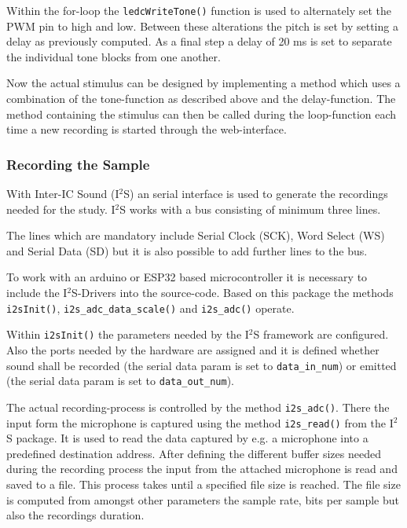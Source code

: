 Within the for-loop the \texttt{ledcWriteTone()} function is used to alternately set the PWM pin to high and low.
Between these alterations the pitch is set by setting a delay as previously computed.
As a final step a delay of 20 ms is set to separate the individual tone blocks from one another.

Now the actual stimulus can be designed by implementing a method which uses a combination of the tone-function as described above and the delay-function.
The method containing the stimulus can then be called during the loop-function each time a new recording is started through the web-interface.

\subsubsection{Recording the Sample}
With Inter-IC Sound (I$^2$S) an serial interface is used to generate the recordings needed for the study.
I$^2$S works with a bus consisting of minimum three lines.

The lines which are mandatory include Serial Clock (SCK), Word Select (WS) and Serial Data (SD) but it is also possible to add further lines to the bus.  

To work with an arduino or ESP32 based microcontroller it is necessary to include the I$^2$S-Drivers into the source-code.
Based on this package the methods\texttt{ i2sInit()}, \texttt{i2s\_adc\_data\_scale()} and \texttt{i2s\_adc()} operate.

Within \texttt{i2sInit()} the parameters needed by the I$^2$S framework are configured.
Also the ports needed by the hardware are assigned and it is defined whether sound shall be recorded (the serial data param is set to \texttt{data\_in\_num}) or emitted (the serial data param is set to \texttt{data\_out\_num}).

The actual recording-process is controlled by the method \texttt{i2s\_adc()}.
There the input form the microphone is captured using the method \texttt{i2s\_read()} from the I$^2$S package.
It is used to read the data captured by e.g. a microphone into a predefined destination address.
After defining the different buffer sizes needed during the recording process the input from the attached microphone is read and saved to a file.
This process takes until a specified file size is reached.
The file size is computed from amongst other parameters the sample rate, bits per sample but also the recordings duration.  


